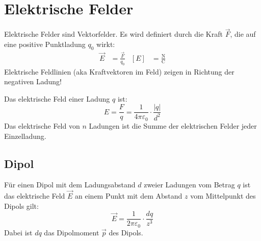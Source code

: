 \section{Elektrische Felder}
Elektrische Felder sind Vektorfelder. Es wird definiert durch die Kraft $\overrightarrow{F}$, die auf eine positive Punktladung $q_0$ wirkt:
\begin{align*}
 \overrightarrow{E}& = \frac{\overrightarrow{F}}{q_0} & [E]& = \frac{\si{\newton}}{\si{\coulomb}}
\end{align*}
Elektrische Feldlinien (aka Kraftvektoren im Feld) zeigen in Richtung der negativen Ladung!

Das elektrische Feld einer Ladung $q$ ist:
\begin{equation*}
 E = \frac{F}{q} = \frac{1}{4 \pi \varepsilon_0} \cdot \frac{|q|}{d^2}
\end{equation*}
Das elektrische Feld von $n$ Ladungen ist die Summe der elektrischen Felder jeder Einzelladung.

\subsection{Dipol}
Für einen Dipol mit dem Ladungsabstand $d$ zweier Ladungen vom Betrag $q$ ist das elektrische Feld $\overrightarrow{E}$ an einem Punkt mit dem Abstand $z$ vom Mittelpunkt des Dipols gilt:
\begin{equation*}
 \overrightarrow{E} = \frac{1}{2 \pi \varepsilon_0} \cdot \frac{dq}{z^3}
\end{equation*}
Dabei ist $dq$ das Dipolmoment $\overrightarrow{p}$ des Dipols.